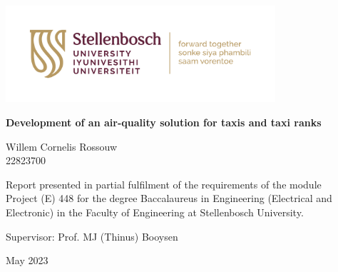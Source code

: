 \graphicspath{{frontmatter/fig/}}

\begin{titlepage}
	\begin{center}
		
		\includegraphics[width=10cm]{SU_corporate_horizontal_with_slogan_RGB}
		
		\vfill
		
		{\rmfamily  \bfseries \huge Development of an air-quality solution for taxis and taxi ranks \par}
		
		\vfill
		
		{\large {\Large Willem Cornelis Rossouw} \\ 22823700 \par}
		
		\vfill
		
		\vfill
		
		 {\large Report presented in partial fulfilment of the requirements of the module \\ Project (E) 448 for the degree Baccalaureus in Engineering (Electrical and Electronic) in the Faculty of Engineering at Stellenbosch University. \par}



		
		\vfill
		
		{\large {Supervisor}: Prof. MJ (Thinus) Booysen } %
		
		\vfill
		
		{\Large May 2023}
	\end{center}
\end{titlepage}
